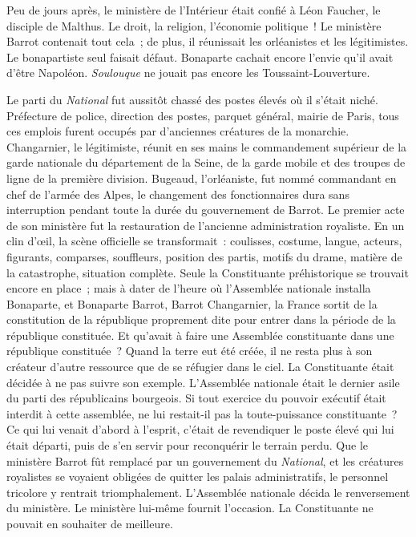 \documentclass[french,twoside]{book} %
\begin{document}
Peu de jours après, le ministère de l’Intérieur était confié à Léon Faucher, le disciple de Malthus. Le droit, la religion, l’économie politique ! Le ministère Barrot contenait tout cela ; de plus, il réunissait les orléanistes et les légitimistes. Le bonapartiste seul faisait défaut. Bonaparte cachait encore l’envie qu’il avait d’être Napoléon. \emph{Soulouque} ne jouait pas encore les Toussaint-Louverture.\par
Le parti du \emph{National} fut aussitôt chassé des postes élevés où il s’était niché. Préfecture de police, direction des postes, parquet général, mairie de Paris, tous ces emplois furent occupés par d’anciennes créatures de la monarchie. Changarnier, le légitimiste, réunit en ses mains le commandement supérieur de la garde nationale du département de la Seine, de la garde mobile et des troupes de ligne de la première division. Bugeaud, l’orléaniste, fut nommé commandant en chef de l’armée des Alpes, le changement des fonctionnaires dura sans interruption pendant toute la durée du gouvernement de Barrot. Le premier acte de son ministère fut la restauration de l’ancienne administration royaliste. En un clin d’œil, la scène officielle se transformait : coulisses, costume, langue, acteurs, figurants, comparses, souffleurs, position des partis, motifs du drame, matière de la catastrophe, situation complète. Seule la Constituante préhistorique se trouvait encore en place ; mais à dater de l’heure où l’Assemblée nationale installa Bonaparte, et Bonaparte Barrot, Barrot Changarnier, la France sortit de la constitution de la république proprement dite pour entrer dans la période de la république constituée. Et qu’avait à faire une Assemblée constituante dans une république constituée ? Quand la terre eut été créée, il ne resta plus à son créateur d’autre ressource que de se réfugier dans le ciel. La Constituante était décidée à ne pas suivre son exemple. L’Assemblée nationale était le dernier asile du parti des républicains bourgeois. Si tout exercice du pouvoir exécutif était interdit à cette assemblée, ne lui restait-il pas la toute-puissance constituante ? Ce qui lui venait d’abord à l’esprit, c’était de revendiquer le poste élevé qui lui était départi, puis de s’en servir pour reconquérir le terrain perdu. Que le ministère Barrot fût remplacé par un gouvernement du \emph{National}, et les créatures royalistes se voyaient obligées de quitter les palais administratifs, le personnel tricolore y rentrait triomphalement. L’Assemblée nationale décida le renversement du ministère. Le ministère lui-même fournit l’occasion. La Constituante ne pouvait en souhaiter de meilleure.\par
\end{document}
